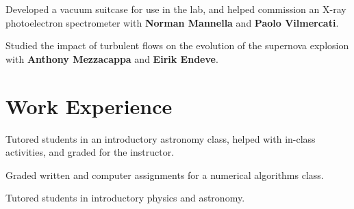 \documentclass[letterpaper]{deedy-resume} %
\begin{document}

Developed a vacuum suitcase for use in the lab, and helped commission an X-ray photoelectron spectrometer with \textbf{Norman Mannella} and \textbf{Paolo Vilmercati}.

\sectionspace %



Studied the impact of turbulent flows on the evolution of the supernova explosion with \textbf{Anthony Mezzacappa} and \textbf{Eirik Endeve}.

\sectionspace %




\section{Work Experience}


Tutored students in an introductory astronomy class, helped with in-class activities, and graded for the instructor.

\sectionspace %



Graded written and computer assignments for a numerical algorithms class.

\sectionspace %



Tutored students in introductory physics and astronomy.
\end{document}
